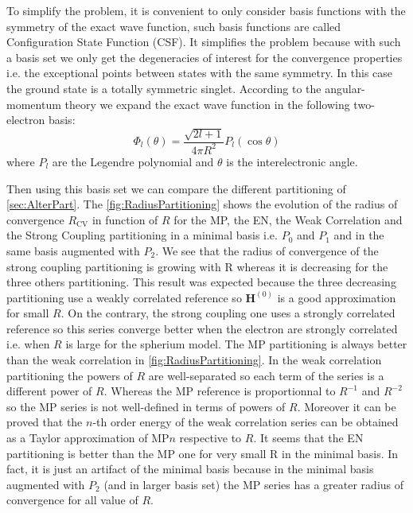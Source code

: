 \documentclass[11pt,a4paper]{article}
\newcommand{\bH}{\mathbf{H}}
\begin{document}
To simplify the problem, it is convenient to only consider basis functions with the symmetry of the exact wave function, such basis functions are called Configuration State Function (CSF). It simplifies the problem because with such a basis set we only get the degeneracies of interest for the convergence properties i.e. the exceptional points between states with the same symmetry. In this case the ground state is a totally symmetric singlet. According to the angular-momentum theory \cite{AngularBook, SlaterBook, Loos_2009} we expand the exact wave function in the following two-electron basis:
\begin{equation}
\Phi_l(\theta)=\frac{\sqrt{2l+1}}{4\pi R^2}P_l(\cos\theta)
\end{equation}
where $P_l$ are the Legendre polynomial and $\theta$ is the interelectronic angle.

Then using this basis set we can compare the different partitioning of \autoref{sec:AlterPart}. The \autoref{fig:RadiusPartitioning} shows the evolution of the radius of convergence $R_{\text{CV}}$ in function of $R$ for the MP, the EN, the Weak Correlation and the Strong Coupling partitioning in a minimal basis i.e. $P_0$ and $P_1$ and in the same basis augmented with $P_2$. We see that the radius of convergence of the strong coupling partitioning is growing with R whereas it is decreasing for the three others partitioning. This result was expected because the three decreasing partitioning use a weakly correlated reference so $\bH^{(0)}$ is a good approximation for small $R$. On the contrary, the strong coupling one uses a strongly correlated reference so this series converge better when the electron are strongly correlated i.e. when $R$ is large for the spherium model.
The MP partitioning is always better than the weak correlation in \autoref{fig:RadiusPartitioning}. In the weak correlation partitioning the powers of $R$ are well-separated so each term of the series is a different power of $R$. Whereas the MP reference is proportionnal to $R^{-1}$ and $R^{-2}$ so the MP series is not well-defined in terms of powers of $R$. Moreover it can be proved that the $n$-th order energy of the weak correlation series can be obtained as a  Taylor approximation of MP$n$ respective to $R$. It seems that the EN partitioning is better than the MP one for very small R in the minimal basis. In fact, it is just an artifact of the minimal basis because in the minimal basis augmented with $P_2
$ (and in larger basis set) the MP series has a greater radius of convergence for all value of $R$.
\end{document}
